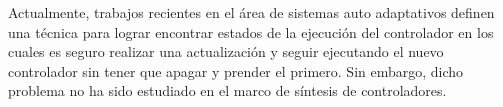 Actualmente, trabajos recientes en el área de sistemas auto adaptativos definen una técnica para lograr encontrar
estados de la ejecución del controlador en los cuales es seguro realizar una actualización y seguir  ejecutando el nuevo
controlador sin tener que apagar y prender el primero. Sin embargo, dicho problema no ha sido estudiado en el marco de
síntesis de controladores.

